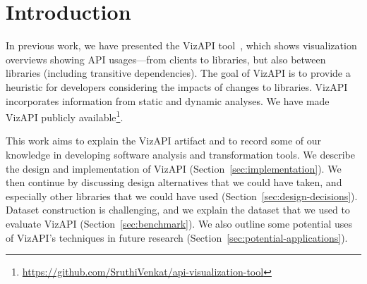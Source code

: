 \section{Introduction}
\label{sec:introduction}

In previous work, we have presented the VizAPI tool~\cite{venkatanarayanan22:_vizap,venkatanarayanan22:_study_lever_api_usage_patter}, which shows visualization overviews showing API usages---from clients to libraries, but also between libraries (including transitive dependencies). The goal of VizAPI is to provide a heuristic for developers considering the impacts of changes to libraries. VizAPI incorporates information from static and dynamic analyses. We have made VizAPI publicly available\footnote{\url{https://github.com/SruthiVenkat/api-visualization-tool}}.

This work aims to explain the VizAPI artifact and to record some of our knowledge in developing software analysis and transformation tools. We describe the design and implementation of VizAPI (Section~\ref{sec:implementation}). We then continue by discussing design alternatives that we could have taken, and especially other libraries that we could have used (Section~\ref{sec:design-decisions}). Dataset construction is challenging, and we explain the dataset that we used to evaluate VizAPI (Section~\ref{sec:benchmark}). We also outline some potential uses of VizAPI's techniques in future research (Section~\ref{sec:potential-applications}).



